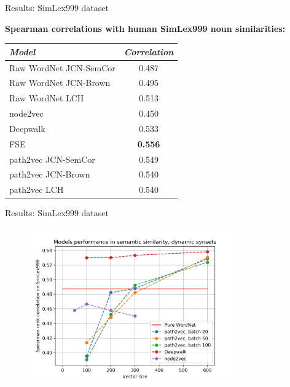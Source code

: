 \begin{frame}{Results: SimLex999 dataset}


\textbf{Spearman correlations with human SimLex999 noun similarities:}


\begin{table}
\begin{tabular}{lc}
\toprule
\textit{Model} & \textit{Correlation} \\
\midrule
Raw WordNet JCN-SemCor & 0.487  \\
Raw WordNet JCN-Brown & 0.495  \\
Raw WordNet LCH & 0.513  \\
\midrule
node2vec { \cite{grover2016node2vec}} & 0.450  \\
Deepwalk { \cite{perozzi2014deepwalk}} & 0.533  \\
FSE { \cite{subercaze:2015}} & \textbf{0.556}  \\
path2vec JCN-SemCor & 0.549  \\
path2vec JCN-Brown & 0.540  \\
path2vec LCH & 0.540  \\
\bottomrule
\end{tabular}
\end{table}

\end{frame}



\begin{frame}{Results: SimLex999 dataset}


\begin{figure}
    \centering
    \includegraphics[width=0.79\textwidth]{figures/jcn-semcor-thresh01-near50_dynamic_synsets.png}
       
\end{figure}
	
\end{frame}

